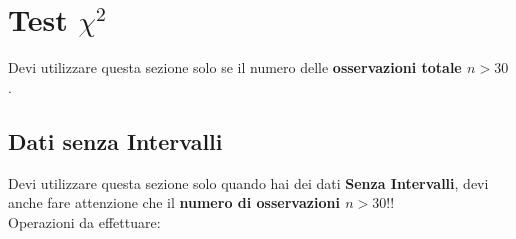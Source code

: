 \section{Test \texorpdfstring{$\chi^2$}{chi quadro}}

Devi utilizzare questa sezione solo se il numero delle \textbf{osservazioni
      totale $n > 30$}.

\subsection{Dati senza Intervalli}

Devi utilizzare questa sezione solo quando hai dei dati \textbf{Senza
      Intervalli}, devi anche fare attenzione che il \textbf{numero di
      osservazioni $n > 30$}!!\\

Operazioni da effettuare:

